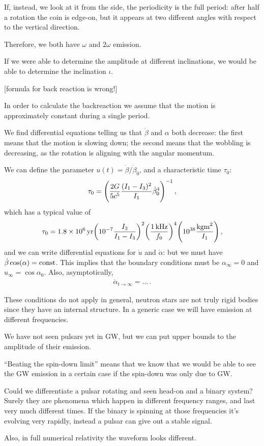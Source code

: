 \documentclass[main.tex]{subfiles}
\begin{document}
If, instead, we look at it from the side, the periodicity is the full period: after half a rotation the coin is edge-on, but it appears at two different angles with respect to the vertical direction.

Therefore, we both have \(\omega \) and \(2 \omega \) emission. 

If we were able to determine the amplitude at different inclinations, we would be able to determine the inclination \(\iota \). 

[formula for back reaction is wrong!]

In order to calculate the backreaction we assume that the motion is approximately constant during a single period. 

We find differential equations telling us that \(\dot{\beta}
\) and \(\alpha \) both decrease: the first means that the motion is slowing down; the second means that the wobbling is decreasing, as the rotation is aligning with the angular momentum.

We can define the parameter \(u(t) = \dot{\beta} / \dot{\beta}_{0}\), and a characteristic time \(\tau_0 \): 
%
\begin{align}
\tau_0  = \qty( \frac{2G}{5 c^{5}} \frac{(I_1 - I_3 )^2}{I_1  } \dot{\beta}_{0}^{4})^{-1}
\,,
\end{align}
%
which has a typical value of 
%
\begin{align}
\tau_0 = \SI{1.8e6}{yr} \qty(\num{e-7} \frac{I_3 }{I_1 - I_3 })^2 \qty( \frac{ \SI{1}{kHz}}{f_0 })^{4} \qty(\num{e38} \frac{\SI{}{kg m^2}}{I_1 })
\,,
\end{align}
%
and we can write differential equations for \(\dot{u}\) and \(\dot{\alpha}\): but we must have \(\dot{\beta} \cos(\alpha ) = \text{const}\). 
This implies that the boundary conditions must be \(\alpha_{ \infty } = 0\) and \(u_{ \infty } = \cos \alpha_0 \). Also, asymptotically, 
%
\begin{align}
\dot{\alpha}_{t \to \infty } = \dots
\,.
\end{align}

These conditions do not apply in general, neutron stars are not truly rigid bodies since they have an internal structure. 
In a generic case we will have emission at different frequencies. 

We have not seen pulsars yet in GW, but we can put upper bounds to the amplitude of their emission. 

``Beating the spin-down limit'' means that we know that we would be able to see the GW emission in a certain case if the spin-down was only due to GW.

Could we differentiate a pulsar rotating and seen head-on and a binary system? 
Surely they are phenomena which happen in different frequency ranges, and last very much different times. 
If the binary is spinning at those frequencies it's evolving very rapidly, instead a pulsar can give out a stable signal. 

Also, in full numerical relativity the waveform looks different. 
\end{document}
